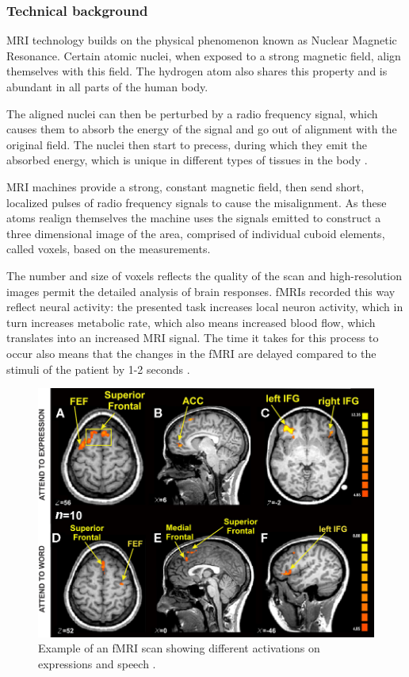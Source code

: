 	
		\subsubsection{Technical background}
		
		MRI technology builds on the physical phenomenon known as Nuclear Magnetic Resonance. Certain atomic nuclei, when exposed to a strong magnetic field, align themselves with this field. The hydrogen atom also shares this property and is abundant in all parts of the human body. 
		
		The aligned nuclei can then be perturbed by a radio frequency signal, which causes them to absorb the energy of the signal and go out of alignment with the original field. The nuclei then start to precess, during which they emit the absorbed energy, which is unique in different types of tissues in the body \cite{plewes2012physics}.
		
		MRI machines provide a strong, constant magnetic field, then send short, localized pulses of radio frequency signals to cause the misalignment. As these atoms realign themselves the machine uses the signals emitted to construct a three dimensional image of the area, comprised of individual cuboid elements, called voxels, based on the measurements.
		
		The number and size of voxels reflects the quality of the scan and high-resolution images permit the detailed analysis of brain responses. fMRIs recorded this way reflect neural activity: the presented task increases local neuron activity, which in turn increases metabolic rate, which also means increased blood flow, which translates into an increased MRI signal. The time it takes for this process to occur also means that the changes in the fMRI are delayed compared to the stimuli of the patient by 1-2 seconds \cite{deyoe1994functional}.
		
		\begin{figure}[!h]
			\centering
			\includegraphics[width=\textwidth]{figures/fmri_example.jpg}
			\caption{Example of an fMRI scan showing different activations on expressions and speech \cite{ovaysikia2011word}.}
		\end{figure}
		
